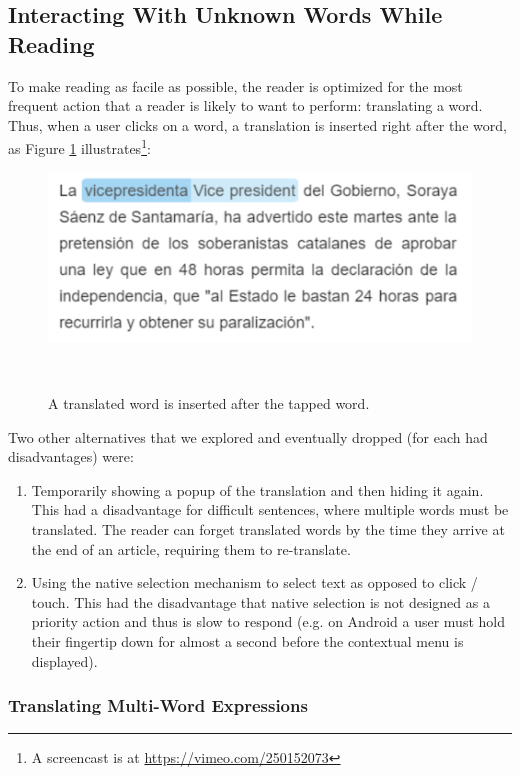 \subsection{Interacting With Unknown Words While Reading}

To make reading as facile as possible, the reader is optimized for the most frequent action that a reader is likely to want to perform: translating a word. Thus, when a user clicks on a word, a translation is inserted right after the word, as Figure \ref{fig:translated_word} illustrates\footnote{A screencast is at \url{https://vimeo.com/250152073}}: 

\begin{figure}[h!]
\centering
  \includegraphics[width=0.75\columnwidth]{figures/translated_word}
  \caption{A translated word is inserted after the tapped word.}~\label{fig:translated_word}
\end{figure}

Two other alternatives that we explored and eventually dropped (for each had disadvantages) were: 

\begin{enumerate}

  \item Temporarily showing a popup of the translation and then hiding it again. This had a disadvantage for difficult sentences, where multiple words must be translated. The reader can forget translated words by the time they arrive at the end of an article, requiring them to re-translate.
  \item Using the native selection mechanism to select text as opposed to click / touch. 
  This had the disadvantage that native selection is not designed as a priority action and thus is slow to respond (e.g. on Android a user must hold their fingertip down for almost a second before the contextual menu is displayed). 
\end{enumerate}


\subsubsection{Translating Multi-Word Expressions}


